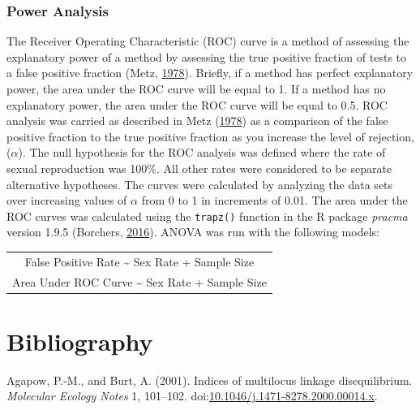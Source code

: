 \documentclass[double,12pt]{beavtex}
\begin{document}
  \subsection{Power Analysis}\label{power-analysis}
  
  The Receiver Operating Characteristic (ROC) curve is a method of
  assessing the explanatory power of a method by assessing the true
  positive fraction of tests to a false positive fraction (Metz,
  \protect\hyperlink{ref-metz1978basic}{1978}). Briefly, if a method has
  perfect explanatory power, the area under the ROC curve will be equal to
  1. If a method has no explanatory power, the area under the ROC curve
  will be equal to 0.5. ROC analysis was carried as described in Metz
  (\protect\hyperlink{ref-metz1978basic}{1978}) as a comparison of the
  false positive fraction to the true positive fraction as you increase
  the level of rejection, (\(\alpha\)). The null hypothesis for the ROC
  analysis was defined where the rate of sexual reproduction was 100\%.
  All other rates were considered to be separate alternative hypotheses.
  The curves were calculated by analyzing the data sets over increasing
  values of \(\alpha\) from 0 to 1 in increments of 0.01. The area under
  the ROC curves was calculated using the \texttt{trapz()} function in the
  R package \emph{pracma} version 1.9.5 (Borchers,
  \protect\hyperlink{ref-borchers2016pracma}{2016}). ANOVA was run with
  the following models:
  
  \begin{longtable}[]{@{}c@{}}
  \toprule
  False Positive Rate \textasciitilde{} Sex Rate + Sample
  Size\tabularnewline
  Area Under ROC Curve \textasciitilde{} Sex Rate + Sample
  Size\tabularnewline
  \bottomrule
  \end{longtable}
  
  \backmatter
  
  \chapter{Bibliography}\label{bibliography}
  
  \noindent
  
  \setlength{\parindent}{-0.20in} \setlength{\leftskip}{0.20in}
  \setlength{\parskip}{8pt} \singlespacing
  
  \hypertarget{refs}{}
  \hypertarget{ref-Agapow_2001}{}
  Agapow, P.-M., and Burt, A. (2001). Indices of multilocus linkage
  disequilibrium. \emph{Molecular Ecology Notes} 1, 101--102.
  doi:\href{https://doi.org/10.1046/j.1471-8278.2000.00014.x}{10.1046/j.1471-8278.2000.00014.x}.
  
\end{document}
